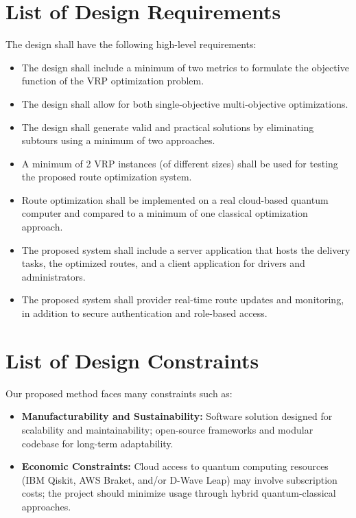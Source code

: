 \documentclass[a4paper]{report}
\begin{document}
{\begin{itemize}
\section{List of Design Requirements }
The design shall have the following high-level requirements:
\begin{itemize}
   \item  The design shall include a minimum of two metrics to formulate the
objective function of the VRP optimization problem.
\item The design shall allow for both single-objective multi-objective
optimizations.
\item The design shall generate valid and practical solutions by
eliminating subtours using a minimum of two approaches.
\item A minimum of 2 VRP instances (of different sizes) shall be used for
testing the proposed route optimization system.
\item Route optimization shall be implemented on a real cloud-based
quantum computer and compared to a minimum of one classical
optimization approach.
\item The proposed system shall include a server application that hosts the
delivery tasks, the optimized routes, and a client application for
drivers and administrators.
\item  The proposed system shall provider real-time route updates and
monitoring, in addition to secure authentication and role-based
access.

\end{itemize}

\section{List of Design Constraints }
Our proposed method faces many constraints such as:

\begin{itemize}
    \item \textbf{Manufacturability and Sustainability:} 
    Software solution designed for scalability and maintainability; open-source frameworks and modular codebase for long-term adaptability.
\end{itemize}

\begin{itemize}
    \item \textbf{Economic Constraints:} 
 Cloud access to quantum computing resources (IBM
Qiskit, AWS Braket, and/or D-Wave Leap) may
involve subscription costs; the project should minimize
usage through hybrid quantum-classical approaches.
\end{itemize}




\end{itemize}}
\end{document}

